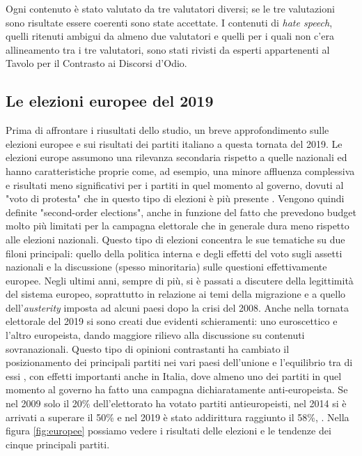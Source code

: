 Ogni contenuto è stato valutato da tre valutatori diversi; se le tre valutazioni sono risultate essere coerenti sono state accettate. I contenuti di \textit{hate speech}, quelli ritenuti ambigui da almeno due valutatori e quelli per i quali non c’era allineamento tra i tre valutatori, sono stati rivisti da esperti appartenenti al Tavolo per il Contrasto ai Discorsi d’Odio.

\subsection{Le elezioni europee del 2019}
Prima di affrontare i riusultati dello studio, un breve approfondimento sulle elezioni europee e sui risultati dei partiti italiano a questa tornata del 2019.
Le elezioni europe assumono una rilevanza secondaria rispetto a quelle nazionali ed hanno caratteristiche proprie come, ad esempio, una minore affluenza complessiva e risultati meno significativi per i partiti in quel momento al governo, dovuti al "voto di protesta" che  in questo tipo di elezioni è più presente \citep{reif1980}. Vengono quindi definite "second-order elections", anche in funzione del fatto che prevedono budget molto più limitati per la campagna elettorale che in generale dura meno rispetto alle elezioni nazionali.
Questo tipo di elezioni concentra le sue tematiche su due filoni principali: quello della politica interna e degli effetti del voto sugli assetti nazionali e la discussione (spesso minoritaria) sulle questioni effettivamente europee. Negli ultimi anni, sempre di più, si è passati a discutere della legittimità del sistema europeo, soprattutto in relazione ai temi della migrazione e a quello dell'\textit{austerity} imposta ad alcuni paesi dopo la crisi del 2008. Anche nella tornata elettorale del 2019 si sono creati due evidenti schieramenti: uno euroscettico e l'altro europeista, dando maggiore rilievo alla discussione su contenuti sovranazionali. Questo tipo di opinioni contrastanti ha cambiato il posizionamento dei principali partiti nei vari paesi dell'unione e l'equilibrio tra di essi \citep{meijers2017}, con effetti importanti anche in Italia, dove  almeno uno dei partiti in quel momento al governo ha fatto una campagna dichiaratamente anti-europeista. Se nel 2009 solo il 20\% dell'elettorato ha votato partiti antieuropeisti, nel 2014 si è arrivati a superare il 50\% e nel 2019 è stato addirittura raggiunto il 58\%, \citep{seddone2019}. Nella figura \ref{fig:europee} possiamo vedere i risultati delle elezioni e le tendenze dei cinque principali partiti.

